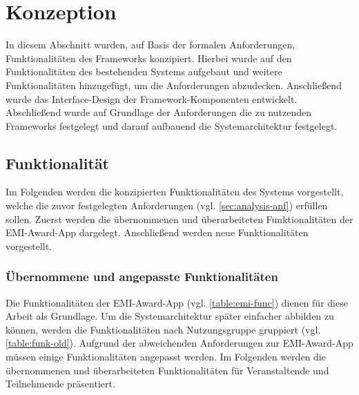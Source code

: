 \chapter{Konzeption} \label{chapter:conception}

In diesem Abschnitt wurden, auf Basis der formalen Anforderungen,
Funktionalitäten des Frameworks konzipiert. Hierbei wurde auf den
Funktionalitäten des bestehenden Systems aufgebaut und weitere Funktionalitäten
hinzugefügt, um die Anforderungen abzudecken. Anschließend wurde das
Interface-Design der Frame\-work-Kom\-po\-nen\-ten entwickelt. Abschließend wurde
auf Grundlage der Anforderungen die zu nutzenden Frameworks festgelegt und
darauf aufbauend die Systemarchitektur festgelegt.

\section{Funktionalität} \label{sec:concept-func}

Im Folgenden werden die konzipierten Funktionalitäten des Systems
vorgestellt, welche die zuvor festgelegten Anforderungen (vgl.
\autoref{sec:analysis-anf}) erfüllen sollen. Zuerst werden die übernommenen und
überarbeiteten Funktionalitäten der EMI-Award-App dargelegt. Anschließend werden
neue Funktionalitäten vorgestellt.

\subsection{Übernommene und angepasste Funktionalitäten}

Die Funktionalitäten der EMI-Award-App (vgl. \autoref{table:emi-func}) dienen für
diese Arbeit als Grundlage. Um die Systemarchitektur später einfacher abbilden
zu können, werden die Funktionalitäten nach Nutzungsgruppe gruppiert (vgl.
\autoref{table:funk-old}). Aufgrund der abweichenden Anforderungen zur
EMI-Award-App müssen einige Funktionalitäten angepasst werden. Im Folgenden
werden die übernommenen und überarbeiteten Funktionalitäten für Veranstaltende
und Teilnehmende präsentiert.

